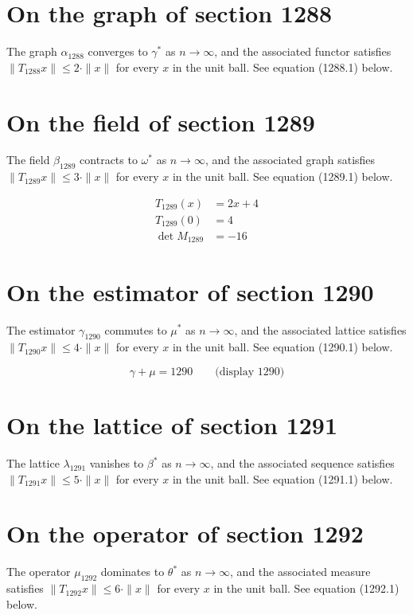\documentclass{article}
\begin{document}
\section{On the graph of section 1288}
The graph $\alpha_{1288}$ converges to $\gamma^{*}$ as $n \to \infty$,
and the associated functor satisfies $\|T_{1288} x\| \leq 2 \cdot \|x\|$
for every $x$ in the unit ball. See equation (1288.1) below.

\section{On the field of section 1289}
The field $\beta_{1289}$ contracts to $\omega^{*}$ as $n \to \infty$,
and the associated graph satisfies $\|T_{1289} x\| \leq 3 \cdot \|x\|$
for every $x$ in the unit ball. See equation (1289.1) below.

\begin{align}
T_{1289}(x) &= 2 x + 4 \\
T_{1289}(0) &= 4 \\
\det M_{1289} &= -16
\end{align}

\section{On the estimator of section 1290}
The estimator $\gamma_{1290}$ commutes to $\mu^{*}$ as $n \to \infty$,
and the associated lattice satisfies $\|T_{1290} x\| \leq 4 \cdot \|x\|$
for every $x$ in the unit ball. See equation (1290.1) below.

$$
\gamma + \mu = 1290 \qquad \text{(display 1290)}
$$

\section{On the lattice of section 1291}
The lattice $\lambda_{1291}$ vanishes to $\beta^{*}$ as $n \to \infty$,
and the associated sequence satisfies $\|T_{1291} x\| \leq 5 \cdot \|x\|$
for every $x$ in the unit ball. See equation (1291.1) below.

\section{On the operator of section 1292}
The operator $\mu_{1292}$ dominates to $\theta^{*}$ as $n \to \infty$,
and the associated measure satisfies $\|T_{1292} x\| \leq 6 \cdot \|x\|$
for every $x$ in the unit ball. See equation (1292.1) below.
\end{document}
